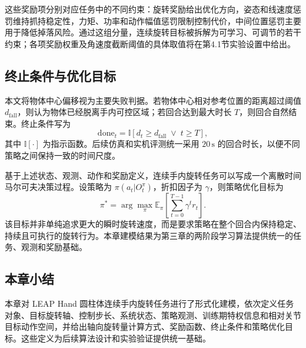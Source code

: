 这些奖励项分别对应任务中的不同约束：旋转奖励给出优化方向，姿态和线速度惩罚维持抓持稳定性，力矩、功率和动作幅值惩罚限制控制代价，中间位置惩罚主要用于降低掉落风险。通过这组分量，连续旋转目标被拆解为可学习、可调节的若干约束；各项奖励权重及角速度截断阈值的具体取值将在第4.1节实验设置中给出。

\subsection{终止条件与优化目标}
\thesisbodyfont
本文将物体中心偏移视为主要失败判据。若物体中心相对参考位置的距离超过阈值 \(d_{\mathrm{fall}}\)，则认为物体已经脱离手内可控区域；若回合达到最大时长 \(T\)，则回合自然结束。终止条件写为
\begin{equation}
\mathrm{done}_t =
\mathbb{I}
\left[
d_t \ge d_{\mathrm{fall}}
\;\lor\;
t \ge T
\right],
\end{equation}
其中 \(\mathbb{I}[\cdot]\) 为指示函数。后续仿真和实机评测统一采用 \(20\,\mathrm{s}\) 的回合时长，以便不同策略之间保持一致的时间尺度。

基于上述状态、观测、动作和奖励定义，连续手内旋转任务可以写成一个离散时间马尔可夫决策过程。设策略为 \(\pi(a_t|O_t^\pi)\)，折扣因子为 \(\gamma\)，则策略优化目标为
\begin{equation}
\pi^\ast
=
\arg\max_{\pi}
\mathbb{E}_{\pi}
\left[
\sum_{t=0}^{T-1}
\gamma^t r_t
\right].
\end{equation}
该目标并非单纯追求更大的瞬时旋转速度，而是要求策略在整个回合内保持稳定、持续且可执行的旋转行为。本章建模结果为第三章的两阶段学习算法提供统一的任务、观测和奖励基础。

\subsection{本章小结}
\thesisbodyfont
本章对 LEAP Hand 圆柱体连续手内旋转任务进行了形式化建模，依次定义任务对象、目标旋转轴、控制步长、系统状态、策略观测、训练期特权信息和相对关节目标动作空间，并给出轴向旋转量计算方式、奖励函数、终止条件和策略优化目标。这些定义为后续算法设计和实验验证提供统一基础。
